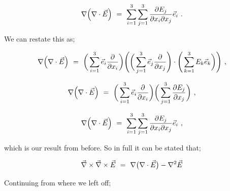 \documentclass{article}
\begin{document}
\begin{equation} \label{eq:51}
\nabla\Big(\nabla\cdot\vec{E}\Big) \hspace{0.125cm} = \hspace{0.125cm} \sum_{i=1}^{3} \sum_{j=1}^{3} \frac{\partial{E_j}}{\partial{x_i}\partial{x_j}} \vec{e}_i \hspace{0.125cm} .
\end{equation}

We can restate this as;

\begin{equation} \label{eq:51}
\nabla\Big(\nabla\cdot\vec{E}\Big) \hspace{0.125cm} = \hspace{0.125cm} \bigg( \sum_{i=1}^{3} \vec{e}_i \frac{\partial}{\partial{x_i}} \bigg)\Bigg(\bigg( \sum_{j=1}^{3} \vec{e}_j \frac{\partial}{\partial{x_j}} \Bigg)\cdot\Bigg( \sum_{k=1}^{3} E_k \vec{e}_k \bigg)\Bigg) \hspace{0.125cm} ,
\end{equation}

\begin{equation} \label{eq:51}
\nabla\Big(\nabla\cdot\vec{E}\Big) \hspace{0.125cm} = \hspace{0.125cm} \bigg( \sum_{i=1}^{3} \vec{e}_i \frac{\partial}{\partial{x_i}} \bigg)\bigg( \sum_{j=1}^{3} \frac{\partial{E_j}}{\partial{x_j}} \bigg) \hspace{0.125cm} ,
\end{equation}

\begin{equation} \label{eq:51}
\nabla\Big(\nabla\cdot\vec{E}\Big) \hspace{0.125cm} = \hspace{0.125cm} \sum_{i=1}^{3} \sum_{j=1}^{3} \frac{\partial{E_j}}{\partial{x_i}\partial{x_j}} \vec{e}_i \hspace{0.125cm} ,
\end{equation}

which is our result from before. So in full it can be stated that;

\begin{equation} \label{eq:51}
\vec{\nabla}\times\vec{\nabla}\times\vec{E} \hspace{0.125cm} = \hspace{0.125cm} \nabla\big(\nabla\cdot\vec{E}\big) - \nabla^{2}\vec{E}
\end{equation}

Continuing from where we left off;
\end{document}
